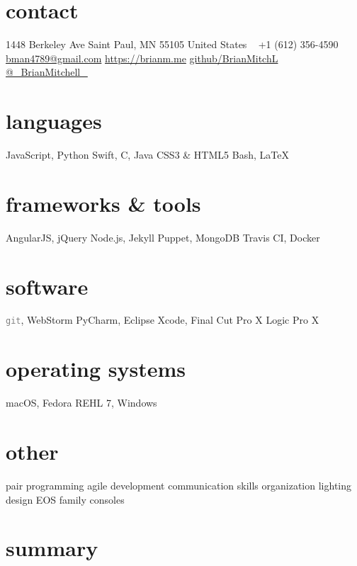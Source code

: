 \documentclass[]{cv-style} %
\begin{document}
\lastupdated


\begin{aside} %
\section{contact}
1448 Berkeley Ave
Saint Paul, MN 55105
United States
~
+1 (612) 356-4590
~
\href{mailto:bman4789@gmail.com}{bman4789@gmail.com}
\href{https://brianm.me}{https://brianm.me}
\href{https://github.com/BrianMitchL}{\textcolor{darkgray}{ }github/BrianMitchL}
\href{https://twitter.com/_BrianMitchell_}{\textcolor{twitter}{ }@\_BrianMitchell\_}
\section{languages}
JavaScript, Python
Swift, C, Java
CSS3 \& HTML5
Bash, \LaTeX
\section{frameworks \& tools}
AngularJS, jQuery
Node.js, Jekyll
Puppet, MongoDB
Travis CI, Docker
\section{software}
\textcolor{gray}{\texttt{git}}, WebStorm
PyCharm, Eclipse
Xcode, Final Cut Pro X
Logic Pro X
\section{operating systems}
macOS, Fedora
REHL 7, Windows
\section{other}
pair programming
agile development
communication skills
organization
lighting design
EOS family consoles
\end{aside}

\vspace{0.2cm}
\section{summary}
\end{document}

